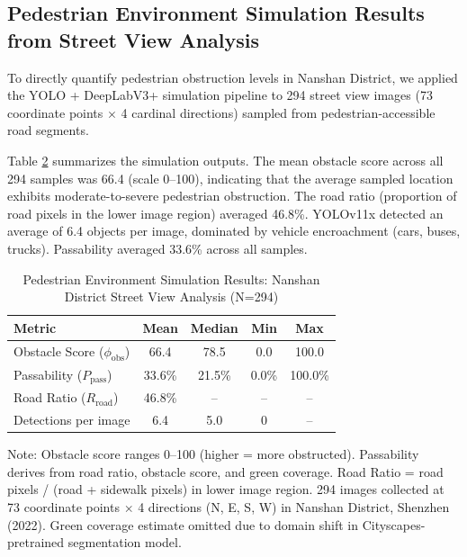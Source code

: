 \documentclass[10pt,conference,compsoc]{IEEEtran}
\begin{document}
\begin{table}[htbp]
\begin{center}
\subsection{Pedestrian Environment Simulation Results from Street View Analysis}

To directly quantify pedestrian obstruction levels in Nanshan District, we applied the YOLO + DeepLabV3+ simulation pipeline to 294 street view images (73 coordinate points $\times$ 4 cardinal directions) sampled from pedestrian-accessible road segments.

Table \ref{tab:sim_results} summarizes the simulation outputs. The mean obstacle score across all 294 samples was 66.4 (scale 0--100), indicating that the average sampled location exhibits moderate-to-severe pedestrian obstruction. The road ratio (proportion of road pixels in the lower image region) averaged 46.8\%. YOLOv11x detected an average of 6.4 objects per image, dominated by vehicle encroachment (cars, buses, trucks). Passability averaged 33.6\% across all samples.

\begin{table}[htbp]
\caption{Pedestrian Environment Simulation Results: Nanshan District Street View Analysis (N=294)}
\label{tab:sim_results}
\begin{center}
\begin{threeparttable}
\begin{tabular}{lcccc}
\toprule
Metric & Mean & Median & Min & Max \\
\midrule
Obstacle Score ($\phi_{\text{obs}}$) & 66.4 & 78.5 & 0.0 & 100.0 \\
Passability ($P_{\text{pass}}$) & 33.6\% & 21.5\% & 0.0\% & 100.0\% \\
Road Ratio ($R_{\text{road}}$) & 46.8\% & -- & -- & -- \\
Detections per image & 6.4 & 5.0 & 0 & -- \\
\bottomrule
\end{tabular}
\begin{tablenotes}
\item Note: Obstacle score ranges 0--100 (higher = more obstructed). Passability derives from road ratio, obstacle score, and green coverage. Road Ratio = road pixels / (road + sidewalk pixels) in lower image region. 294 images collected at 73 coordinate points $\times$ 4 directions (N, E, S, W) in Nanshan District, Shenzhen (2022). Green coverage estimate omitted due to domain shift in Cityscapes-pretrained segmentation model.
\end{tablenotes}
\end{threeparttable}
\end{center}
\end{table}


\end{center}
\end{table}
\end{document}
